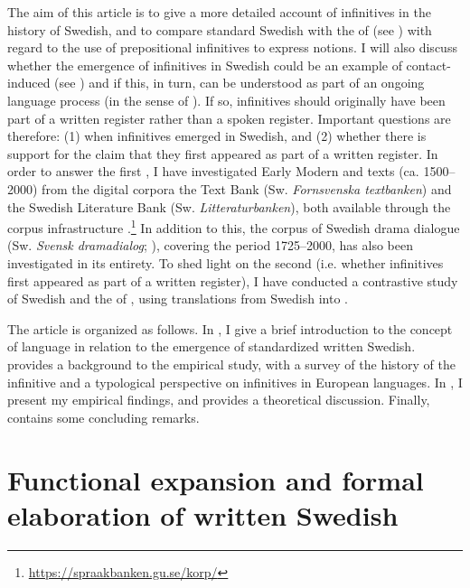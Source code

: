 \documentclass[output=paper]{langscibook}
\begin{document}
The aim of this article is to give a more detailed account of  infinitives in the history of Swedish, and to compare standard Swedish with the  of  (see ) with regard to the use of prepositional infinitives to express  notions. I will also discuss whether the emergence of  infinitives in Swedish could be an example of contact-induced  (see \citealt{HeineKuteva2003, HeineKuteva2005}) and if this, in turn, can be understood as part of an ongoing language  process (in the sense of \citealt{Kloss1967}). If so,  infinitives should originally have been part of a written register rather than a spoken register. Important questions are therefore: (1) when  infinitives emerged in Swedish, and (2) whether there is support for the claim that they first appeared as part of a written register. In order to answer the first , I have investigated Early Modern and  texts (ca. 1500–2000) from the digital corpora the  Text Bank (Sw. \textit{Fornsvenska textbanken}) and the Swedish Literature Bank (Sw. \textit{Litteraturbanken}), both available through the corpus infrastructure  \citep{BorinEtAl2012}.\footnote{\url{https://spraakbanken.gu.se/korp/}}  In addition to this, the corpus of Swedish drama dialogue (Sw. \textit{Svensk dramadialog}; \citealt{MarttalaStromquist2001}), covering the period 1725–2000, has also been investigated in its entirety. To shed light on the second  (i.e. whether  infinitives first appeared as part of a written register), I have conducted a contrastive study of Swedish and the  of , using translations from Swedish into .



The article is organized as follows. In , I give a brief introduction to the concept of language  in relation to the emergence of standardized written Swedish.  provides a background to the empirical study, with a survey of the history of the  infinitive and a typological perspective on  infinitives in European languages. In , I present my empirical findings, and  provides a theoretical discussion. Finally,  contains some concluding remarks. 


\section{Functional expansion and formal elaboration of written Swedish}\label{sec:kalm:2}
\end{document}
